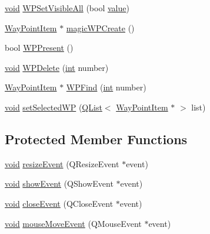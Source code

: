 \begin{DoxyCompactItemize}
\item 
\hyperlink{group___u_a_v_objects_plugin_ga444cf2ff3f0ecbe028adce838d373f5c}{void} \hyperlink{group___o_p_map_widget_ga9a1f7cb8eb3ca498061257be74ed76c6}{W\-P\-Set\-Visible\-All} (bool \hyperlink{glext_8h_aa0e2e9cea7f208d28acda0480144beb0}{value})
\item 
\hyperlink{classmapcontrol_1_1_way_point_item}{Way\-Point\-Item} $\ast$ \hyperlink{group___o_p_map_widget_gad4bf26f4b1c6f177513e61bd70956360}{magic\-W\-P\-Create} ()
\item 
bool \hyperlink{group___o_p_map_widget_ga22fc188ce6991cc900182e1a60b3ee34}{W\-P\-Present} ()
\item 
\hyperlink{group___u_a_v_objects_plugin_ga444cf2ff3f0ecbe028adce838d373f5c}{void} \hyperlink{group___o_p_map_widget_ga7bea26b184175ee4cf10a9103b59de32}{W\-P\-Delete} (\hyperlink{ioapi_8h_a787fa3cf048117ba7123753c1e74fcd6}{int} number)
\item 
\hyperlink{classmapcontrol_1_1_way_point_item}{Way\-Point\-Item} $\ast$ \hyperlink{group___o_p_map_widget_ga633b72f3ab012b8e9b8f6e58b75bfbb8}{W\-P\-Find} (\hyperlink{ioapi_8h_a787fa3cf048117ba7123753c1e74fcd6}{int} number)
\item 
\hyperlink{group___u_a_v_objects_plugin_ga444cf2ff3f0ecbe028adce838d373f5c}{void} \hyperlink{group___o_p_map_widget_ga611fd47fbd108d887b40a1d1a878bd27}{set\-Selected\-W\-P} (\hyperlink{class_q_list}{Q\-List}$<$ \hyperlink{classmapcontrol_1_1_way_point_item}{Way\-Point\-Item} $\ast$ $>$ list)
\end{DoxyCompactItemize}
\subsection*{Protected Member Functions}
\begin{DoxyCompactItemize}
\item 
\hyperlink{group___u_a_v_objects_plugin_ga444cf2ff3f0ecbe028adce838d373f5c}{void} \hyperlink{group___o_p_map_widget_gaeb81f004806916633910751cfe808de8}{resize\-Event} (Q\-Resize\-Event $\ast$event)
\item 
\hyperlink{group___u_a_v_objects_plugin_ga444cf2ff3f0ecbe028adce838d373f5c}{void} \hyperlink{group___o_p_map_widget_gaa02db9787da06fe405061620b80605d4}{show\-Event} (Q\-Show\-Event $\ast$event)
\item 
\hyperlink{group___u_a_v_objects_plugin_ga444cf2ff3f0ecbe028adce838d373f5c}{void} \hyperlink{group___o_p_map_widget_gabb098a73bed666626144c0da8332c609}{close\-Event} (Q\-Close\-Event $\ast$event)
\item 
\hyperlink{group___u_a_v_objects_plugin_ga444cf2ff3f0ecbe028adce838d373f5c}{void} \hyperlink{group___o_p_map_widget_gaac8f40f4fe29d88750285c003b3f7b3f}{mouse\-Move\-Event} (Q\-Mouse\-Event $\ast$event)
\end{DoxyCompactItemize}
